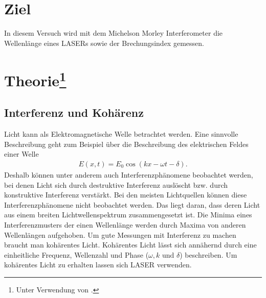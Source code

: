 \section{Ziel}
In diesem Versuch wird mit dem Michelson Morley Interferometer die Wellenlänge eines LASERs sowie der Brechungsindex gemessen.

\section[Theorie]{Theorie\footnote[1]{Unter Verwendung von \cite{man:v401}.}}
\subsection{Interferenz und Kohärenz}
Licht kann als Elektromagnetische Welle betrachtet werden.
Eine sinnvolle Beschreibung geht zum Beispiel über die Beschreibung des elektrischen Feldes einer Welle
\begin{align}
    E(x,t) = E_0 \cos(kx - \omega t - \delta).
\end{align} 
Deshalb können unter anderem auch Interferenzphänomene beobachtet werden, bei denen Licht sich durch destruktive Interferenz auslöscht bzw.
durch konstruktive Interferenz verstärkt.
Bei den meisten Lichtquellen können diese Interferenzphänomene nicht beobachtet werden. 
Das liegt daran, dass deren Licht aus einem breiten Lichtwellenspektrum zusammengesetzt ist.
Die Minima eines Interferenzmusters der einen Wellenlänge werden durch Maxima von anderen Wellenlängen aufgehoben.
Um gute Messungen mit Interferenz zu machen braucht man kohärentes Licht.
Kohärentes Licht lässt sich annähernd durch eine einheitliche Frequenz, Wellenzahl und Phase ($\omega, k \text{ und } \delta$) beschreiben.
Um kohärentes Licht zu erhalten lassen sich LASER verwenden.

